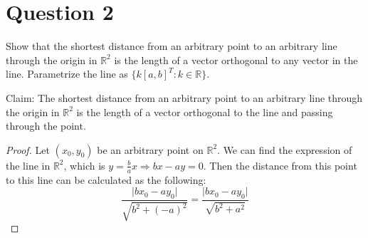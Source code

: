 \section{Question 2}

\begin{question}
    Show that the shortest distance from an arbitrary point to an arbitrary line through the origin in $\mathbb{R}^2$ is the length of a vector orthogonal to any vector in the line. Parametrize the line as $\{k[a,b]^T: k \in \mathbb{R}\}$.
\end{question}

\begin{answer}
    Claim: The shortest distance from an arbitrary point to an arbitrary line through the origin in ${\mathbb{R}}^2$ is the length of a vector orthogonal to the line and passing through the point.
    \begin{proof}
    Let $(x_0,y_0)$ be an arbitrary point on ${\mathbb{R}}^2$. We can find the expression of the line in ${\mathbb{R}}^2$, which is $y = \tfrac{b}{a}x \Rightarrow bx - ay = 0$. Then the distance from this point to this line can be calculated as the following:
    \begin{equation}
        \dfrac{\lvert bx_0 - ay_0 \rvert}{\sqrt{b^2 + {(-a)}^2}} = \dfrac{\lvert bx_0 - ay_0 \rvert}{\sqrt{b^2 + a^2}}
    \end{equation}
    
    \end{proof}
\end{answer}
